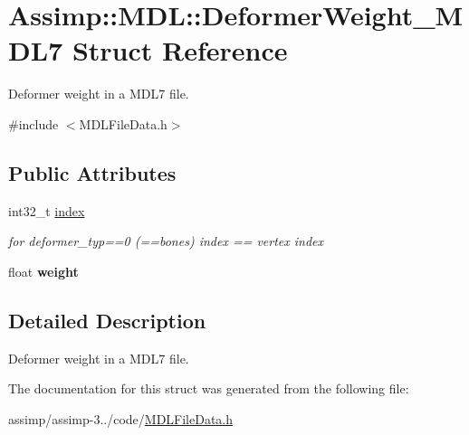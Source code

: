 \hypertarget{struct_assimp_1_1_m_d_l_1_1_deformer_weight___m_d_l7}{\section{Assimp\+:\+:M\+D\+L\+:\+:Deformer\+Weight\+\_\+\+M\+D\+L7 Struct Reference}
\label{struct_assimp_1_1_m_d_l_1_1_deformer_weight___m_d_l7}
}


Deformer weight in a M\+D\+L7 file.  




{\ttfamily \#include $<$M\+D\+L\+File\+Data.\+h$>$}

\subsection*{Public Attributes}
\begin{DoxyCompactItemize}
\item 
\hypertarget{struct_assimp_1_1_m_d_l_1_1_deformer_weight___m_d_l7_aececf8228d2a8b647586c4a01ef679ff}{int32\+\_\+t \hyperlink{struct_assimp_1_1_m_d_l_1_1_deformer_weight___m_d_l7_aececf8228d2a8b647586c4a01ef679ff}{index}}\label{struct_assimp_1_1_m_d_l_1_1_deformer_weight___m_d_l7_aececf8228d2a8b647586c4a01ef679ff}

\begin{DoxyCompactList}\small\item\em for deformer\+\_\+typ==0 (==bones) index == vertex index \end{DoxyCompactList}\item 
\hypertarget{struct_assimp_1_1_m_d_l_1_1_deformer_weight___m_d_l7_aeabfd0ad4969bdabb7bf1f0fbc5ca8fc}{float {\bfseries weight}}\label{struct_assimp_1_1_m_d_l_1_1_deformer_weight___m_d_l7_aeabfd0ad4969bdabb7bf1f0fbc5ca8fc}

\end{DoxyCompactItemize}


\subsection{Detailed Description}
Deformer weight in a M\+D\+L7 file. 

The documentation for this struct was generated from the following file\+:\begin{DoxyCompactItemize}
\item 
assimp/assimp-\/3../code/\hyperlink{_m_d_l_file_data_8h}{M\+D\+L\+File\+Data.\+h}\end{DoxyCompactItemize}
